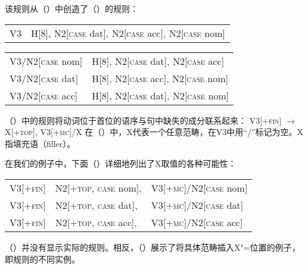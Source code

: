 \noindent
该规则从（）中创造了（）的规则：
\ea
\begin{tabular}[t]{@{}l@{~$\to$~}l@{}}
V3  & H[8], N2[\textsc{case} dat], N2[\textsc{case} acc], N2[\textsc{case} nom] 
\end{tabular}
\z
\ea
\begin{tabular}[t]{@{}l@{~$\to$~}l@{}}
V3/N2[\textsc{case} nom] &  H[8], N2[\textsc{case} dat], N2[\textsc{case} acc]\\
V3/N2[\textsc{case} dat] &  H[8], N2[\textsc{case} acc], N2[\textsc{case} nom]\\
V3/N2[\textsc{case} acc] &  H[8], N2[\textsc{case} dat], N2[\textsc{case} nom]\\
\end{tabular}
\z

\noindent
（）中的规则将动词位于首位的语序与句中缺失的成分联系起来：
\ea
\label{gpsg-vs-regel}
V3[+\textsc{fin}] $\to$ X[+\textsc{top}], V3[+\textsc{mc}]/X
\z
在（）中，X代表一个任意范畴，在V3中用“/”标记为空。X指填充语（filler）。

在我们的例子中，下面（）详细地列出了X取值的各种可能性：
\ea
\begin{tabular}[t]{@{}l@{~$\to$~}l@{~}l@{}}
V3[+\textsc{fin}] & N2[+\textsc{top}, \textsc{case} nom], & V3[+\textsc{mc}]/N2[\textsc{case} nom]\\
V3[+\textsc{fin}] & N2[+\textsc{top}, \textsc{case} dat], & V3[+\textsc{mc}]/N2[\textsc{case} dat]\\
V3[+\textsc{fin}] & N2[+\textsc{top}, \textsc{case} acc], & V3[+\textsc{mc}]/N2[\textsc{case} acc]\\
\end{tabular}
\z
（）并没有显示实际的规则。相反，（）展示了将具体范畴插入X"=位置的例子，即规则的不同实例。

